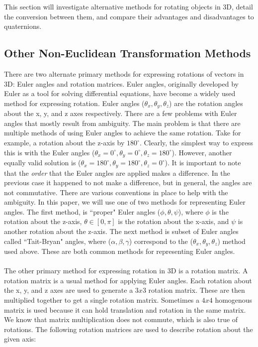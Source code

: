 This section will investigate alternative methods for rotating objects in 3D, detail the conversion between them,  and compare their advantages and disadvantages to quaternions.

\subsection{Other Non-Euclidean Transformation Methods}
There are two alternate primary methods for expressing rotations of vectors in 3D: Euler angles and rotation matrices.
Euler angles, originally developed by Euler as a tool for solving differential equations, have become a widely used method for expressing rotation.
Euler angles ($\theta_x, \theta_y, \theta_z$) are the rotation angles about the x, y, and z axes respectively.
There are a few problems with Euler angles that mostly result from ambiguity.
The main problem is that there are multiple methods of using Euler angles to achieve the same rotation.
Take for example, a rotation about the z-axis by $180^\circ$.
Clearly, the simplest way to express this is with the Euler angles ($\theta_x = 0^\circ, \theta_y = 0^\circ, \theta_z = 180^\circ$).
However, another equally valid solution is ($\theta_x = 180^\circ, \theta_y = 180^\circ, \theta_z = 0^\circ$).
It is important to note that the \textit{order} that the Euler angles are applied makes a difference.
In the previous case it happened to not make a difference, but in general, the angles are not commutative.
There are various conventions in place to help with the ambiguity.
In this paper, we will use one of two methods for representing Euler angles.
The first method, is ``proper" Euler angles ($\phi, \theta, \psi$), where $\phi$ is the rotation about the z-axis, $\theta \in [0, \pi]$ is the rotation about the x-axis, and $\psi$ is another rotation about the z-axis.
The next method is subset of Euler angles called ``Tait-Bryan" angles, where ($\alpha, \beta, \gamma$) correspond to the ($\theta_x, \theta_y, \theta_z$) method used above.
These are both common methods for representing Euler angles.
\\ \\ The other primary method for expressing rotation in 3D is a rotation matrix.
A rotation matrix is a usual method for applying Euler angles.
Each rotation about the x, y, and z axes are used to generate a $3x3$ rotation matrix.
These are then multiplied together to get a single rotation matrix.
Sometimes a $4x4$ homogenous matrix is used because it can hold translation and rotation in the same matrix.
We know that matrix multiplication does not commute, which is also true of rotations.
The following rotation matrices are used to describe rotation about the given axis:

